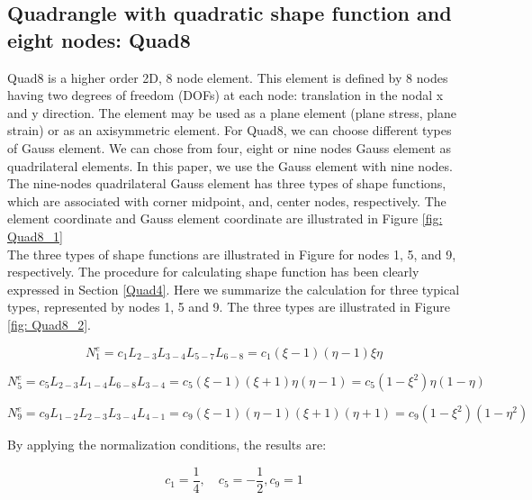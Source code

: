 \subsection{Quadrangle with quadratic shape function and eight nodes: Quad8}
Quad8 is a higher order 2D, 8 node element. This element is defined by 8 nodes having two degrees of freedom (DOFs) at each node: translation in the nodal x and y direction. The element may be used as a plane element (plane stress, plane strain) or as an axisymmetric element. For Quad8, we can choose different types of Gauss element.  We can chose from four, eight or nine nodes Gauss element as quadrilateral elements. In this paper, we use the Gauss element with nine nodes. The nine-nodes quadrilateral Gauss element has three types of shape functions, which are associated with corner midpoint, and, center nodes, respectively. The element coordinate and Gauss element coordinate are illustrated in Figure \ref{fig: Quad8_1} \\
The three types of shape functions are illustrated in Figure  for nodes 1, 5, and 9, respectively. The procedure for calculating shape function has been clearly expressed in Section \ref{Quad4}. Here we summarize the calculation for three typical types, represented by nodes 1, 5 and 9. The three types are illustrated in Figure \ref{fig: Quad8_2}.

\begin{equation} \label{eq: Quad8_1}
N_1^e = c_1 L_{2-3}L_{3-4}L_{5-7} L_{6-8} = c_1 \left(\xi - 1\right) \left(\eta -1\right) \xi \eta
\end{equation}

\begin{equation} \label{eq: Quad8_2}
N_5^e = c_5L_{2-3} L_{1-4} L_{6-8} L_{3-4} = c_5 \left(\xi -1 \right) \left( \xi +1\right) \eta \left( \eta -1\right) = c_5 \left(1-\xi^2\right) \eta \left(1 - \eta\right)
\end{equation}

\begin{equation} \label{eq: Quad8_3}
N_9^e = c_9L_{1-2} L_{2-3} L_{3-4} L_{4-1} = c_9 \left(\xi -1 \right) \left( \eta - 1\right) \left(\xi + 1\right) \left( \eta + 1\right) = c_9 \left(1-\xi^2\right) \left(1 - \eta^2\right)
\end{equation}

By applying the normalization conditions, the results are:

\begin{equation*}
c_1 = \frac{1}{4}, \quad c_5 = -\frac{1}{2}, c_9 = 1
\end{equation*}


